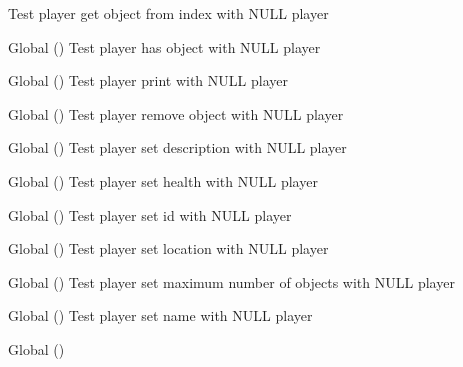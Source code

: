 \begin{DoxyRefList}
%
Test player get object from index with NULL player  
\item[Global \doxylink{player__test_8c_ae8953d45d8f555a930dbc8aba101d399}{test2\+\_\+player\+\_\+has\+\_\+object} ()]\label{test__test000111}%
%
Test player has object with NULL player  
\item[Global \doxylink{player__test_8c_a46b5c792a37831e8c142d4c32b9767f7}{test2\+\_\+player\+\_\+print} ()]\label{test__test000099}%
%
Test player print with NULL player  
\item[Global \doxylink{player__test_8c_af9e74e12ad6961761f1ff61afa56be3e}{test2\+\_\+player\+\_\+remove\+\_\+object} ()]\label{test__test000109}%
%
Test player remove object with NULL player  
\item[Global \doxylink{player__test_8c_a1e47a0571a050194ebe7f0cf6102033e}{test2\+\_\+player\+\_\+set\+\_\+description} ()]\label{test__test000095}%
%
Test player set description with NULL player  
\item[Global \doxylink{player__test_8c_aca602481af023c45a1fe6825860aa184}{test2\+\_\+player\+\_\+set\+\_\+health} ()]\label{test__test000089}%
%
Test player set health with NULL player  
\item[Global \doxylink{player__test_8c_a3695e0896bc3d770290e6a691fa212f7}{test2\+\_\+player\+\_\+set\+\_\+id} ()]\label{test__test000081}%
%
Test player set id with NULL player  
\item[Global \doxylink{player__test_8c_a2c702753d9e2e3df9ef4abf2d1b9bc8d}{test2\+\_\+player\+\_\+set\+\_\+location} ()]\label{test__test000103}%
%
Test player set location with NULL player  
\item[Global \doxylink{player__test_8c_aebb4907ff20d7692475a1f599182e5de}{test2\+\_\+player\+\_\+set\+\_\+max\+\_\+objs} ()]\label{test__test000115}%
%
Test player set maximum number of objects with NULL player  
\item[Global \doxylink{player__test_8c_a6e7ce8ff791f4bf63749df647a44263f}{test2\+\_\+player\+\_\+set\+\_\+name} ()]\label{test__test000085}%
%
Test player set name with NULL player  
\item[Global \doxylink{set__test_8c_a8f373a2609fb5770b0663e26df0cb7c4}{test2\+\_\+set\+\_\+add\+\_\+id} ()]\label{test__test000120}%
%

\end{DoxyRefList}
